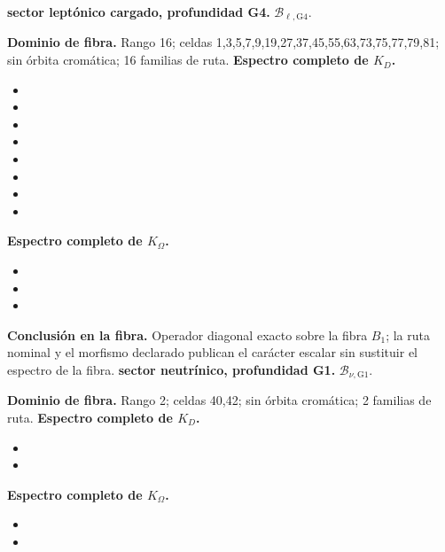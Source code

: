 \medskip
{}
\noindent\textbf{sector leptónico cargado, profundidad G4.} \(\mathcal B_{\ell,\mathrm{G4}}\).\par
\noindent\textbf{Dominio de fibra.} Rango 16; celdas 1,3,5,7,9,19,27,37,45,55,63,73,75,77,79,81; sin órbita cromática; 16 familias de ruta.
\noindent\textbf{Espectro completo de \(K_D\).}
\begin{itemize}
\item \texttt{}
\item \texttt{}
\item \texttt{}
\item \texttt{}
\item \texttt{}
\item \texttt{}
\item \texttt{}
\item \texttt{}
\end{itemize}
\noindent\textbf{Espectro completo de \(K_\Omega\).}
\begin{itemize}
\item \texttt{}
\item \texttt{}
\item \texttt{}
\end{itemize}
\noindent\textbf{Conclusión en la fibra.} Operador diagonal exacto sobre la fibra \(B_1\); la ruta nominal y el morfismo declarado publican el carácter escalar sin sustituir el espectro de la fibra.
\medskip
{}
\noindent\textbf{sector neutrínico, profundidad G1.} \(\mathcal B_{\nu,\mathrm{G1}}\).\par
\noindent\textbf{Dominio de fibra.} Rango 2; celdas 40,42; sin órbita cromática; 2 familias de ruta.
\noindent\textbf{Espectro completo de \(K_D\).}
\begin{itemize}
\item \texttt{}
\item \texttt{}
\end{itemize}
\noindent\textbf{Espectro completo de \(K_\Omega\).}
\begin{itemize}
\item \texttt{}
\item \texttt{}
\end{itemize}
